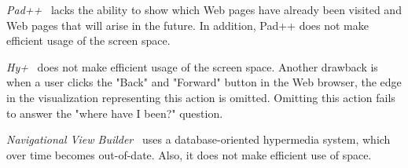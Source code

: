 \documentclass[10pt,psfig]{article}
\begin{document}
{%
{\em Pad++}~\cite{b96} lacks the ability to show which Web pages have already been visited and Web pages that will arise in the future.
In addition, Pad++ does not make efficient usage of the screen space.

{\em Hy+}~\cite{hmv-95} does not make efficient usage of the screen space.  Another drawback is when a user clicks the "Back" and "Forward" button in the Web browser, the edge in the visualization representing this action is omitted.  Omitting this action fails to answer the "where have I been?" question.

{\em Navigational View Builder}~\cite{mf-95} uses a database-oriented hypermedia system, which over time becomes out-of-date.
Also, it does not make efficient use of space.


}
\end{document}
